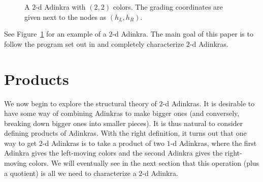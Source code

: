 \documentclass[12pt,twoside,singlespace]{article}
\numberwithin{equation}{section}
\theoremstyle{definition}
\begin{document}
\begin{figure}[htb]
\begin{center}
\caption{A $2$-d Adinkra with $(2,2)$ colors. The grading coordinates are given next to the nodes as $(h_L, h_R)$. \label{fig:2d-example}}
\end{center}
\end{figure}

See Figure~\ref{fig:2d-example} for an example of a $2$-d Adinkra. The main goal of this paper is to follow the program set out in \cite{hubsch:weaving} and completely characterize $2$-d Adinkras.

\section{Products}
\label{sec:products}

We now begin to explore the structural theory of $2$-d Adinkras. It is desirable to have some way of combining Adinkras to make bigger ones (and conversely, breaking down bigger ones into smaller pieces). It is thus natural to consider defining products of Adinkras. With the right definition, it turns out that one way to get $2$-d Adinkras is to take a product of two $1$-d Adinkras, where the first Adinkra gives the left-moving colors and the second Adinkra gives the right-moving colors. We will eventually see in the next section that this operation (plus a quotient) is all we need to characterize a $2$-d Adinkra.
\end{document}

